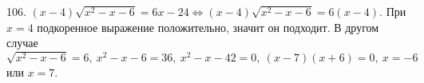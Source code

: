 106. $(x-4)\sqrt{x^2-x-6}=6x-24\Leftrightarrow (x-4)\sqrt{x^2-x-6}=6(x-4).$ При $x=4$ подкоренное выражение положительно, значит он подходит. В другом случае $\sqrt{x^2-x-6}=6,\ x^2-x-6=36,\ x^2-x-42=0,\ (x-7)(x+6)=0,\ x=-6$ или $x=7.$\\
